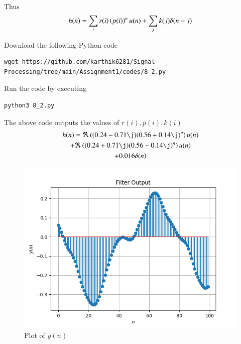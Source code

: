 \documentclass[journal,12pt,twocolumn]{IEEEtran}
\renewcommand\thesection{\arabic{section}}
\begin{document}
\begin{enumerate}[label=\thesection.\arabic*]
               Thus
               \begin{align}
                    h(n) = \sum_i r(i)\left(p(i)\right)^nu(n) + \sum_j k(j)\delta(n-j)
               \end{align}

               Download the following Python code
               \begin{lstlisting}
wget https://github.com/karthik6281/Signal-Processing/tree/main/Assignment1/codes/8_2.py
                    \end{lstlisting}

               Run the code by executing
               \begin{lstlisting}
python3 8_2.py
               \end{lstlisting}

               The above code outputs the values of $r(i), p(i), k(i)$
               \begin{multline}
                    h(n) =
                    \Re\brak{(0.24 - 0.71\j)(0.56 + 0.14\j)^n} u(n) \\
                    + \Re\brak{(0.24 + 0.71\j)(0.56 - 0.14\j)^n} u(n) \\
                    + 0.016\delta(n)
               \end{multline}

               \begin{figure}[!ht]
                    \centering
                    \includegraphics[width=\columnwidth]{./figs/8_2_1.png}
                    \caption{Plot of $y(n)$}
                    \label{fig-8.2.1}
               \end{figure}


\end{enumerate}
\end{document}
